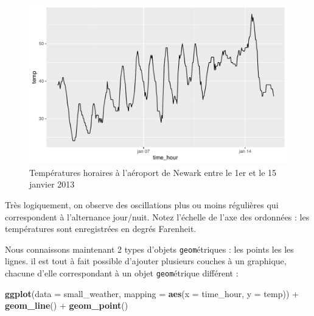 \documentclass[a4paperpaper,]{article}
\newenvironment{Shaded}{\begin{snugshade}}{\end{snugshade}}
\newcommand{\DataTypeTok}[1]{\textcolor[rgb]{0.00,0.34,0.68}{#1}}
\newcommand{\KeywordTok}[1]{\textcolor[rgb]{0.12,0.11,0.11}{\textbf{#1}}}
\newcommand{\NormalTok}[1]{\textcolor[rgb]{0.12,0.11,0.11}{#1}}
\newcommand{\OperatorTok}[1]{\textcolor[rgb]{0.12,0.11,0.11}{#1}}
\newcommand{\StringTok}[1]{\textcolor[rgb]{0.75,0.01,0.01}{#1}}
\theoremstyle{definition}
\theoremstyle{definition}
\theoremstyle{definition}
\theoremstyle{remark}
\begin{document}
\begin{figure}[htpb]

{\centering \includegraphics[width=0.9\linewidth]{figure/linegraph-1} 

}

\caption{Températures horaires à l'aéroport de Newark entre le 1er et le 15 janvier 2013}\label{fig:linegraph}
\end{figure}

Très logiquement, on observe des oscillations plus ou moins régulières
qui correspondent à l'alternance jour/nuit. Notez l'échelle de l'axe des
ordonnées : les températures sont enregistrées en degrés Farenheit.

Nous connaissons maintenant 2 types d'objets \texttt{geom}étriques : les
points les les lignes. il est tout à fait possible d'ajouter plusieurs
couches à un graphique, chacune d'elle correspondant à un objet
\texttt{geom}étrique différent :

\begin{Shaded}
\begin{Highlighting}[]
\KeywordTok{ggplot}\NormalTok{(}\DataTypeTok{data =}\NormalTok{ small_weather, }\DataTypeTok{mapping =} \KeywordTok{aes}\NormalTok{(}\DataTypeTok{x =}\NormalTok{ time_hour, }\DataTypeTok{y =}\NormalTok{ temp)) }\OperatorTok{+}
\StringTok{  }\KeywordTok{geom_line}\NormalTok{() }\OperatorTok{+}
\StringTok{  }\KeywordTok{geom_point}\NormalTok{()}
\end{Highlighting}
\end{Shaded}
\end{document}
